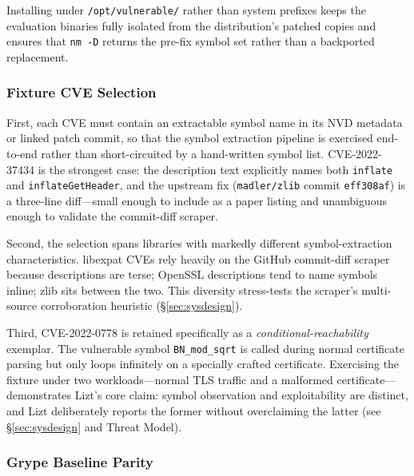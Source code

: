 \documentclass[conference]{IEEEtran}
\begin{document}
Installing under \texttt{/opt/vulnerable/} rather than system prefixes keeps the evaluation binaries fully isolated from the distribution's patched copies and ensures that \texttt{nm -D} returns the pre-fix symbol set rather than a backported replacement.

\subsubsection{Fixture CVE Selection}

First, each CVE must contain an extractable symbol name in its NVD metadata or linked patch commit, so that the symbol extraction pipeline is exercised end-to-end rather than short-circuited by a hand-written symbol list.
CVE-2022-37434 is the strongest case: the description text explicitly names both \texttt{inflate} and \texttt{inflateGetHeader}, and the upstream fix (\texttt{madler/zlib} commit \texttt{eff308af}) is a three-line diff---small enough to include as a paper listing and unambiguous enough to validate the commit-diff scraper.

Second, the selection spans libraries with markedly different symbol-extraction characteristics. libexpat CVEs rely heavily on the GitHub commit-diff scraper because descriptions are terse; OpenSSL descriptions tend to name symbols inline; zlib sits between the two.
This diversity stress-tests the scraper's multi-source corroboration heuristic (\S\ref{sec:sysdesign}).

Third, CVE-2022-0778 is retained specifically as a \emph{conditional-reachability} exemplar.
The vulnerable symbol \texttt{BN\_mod\_sqrt} is called during normal certificate parsing but only loops infinitely on a specially crafted certificate.
Exercising the fixture under two workloads---normal TLS traffic and a malformed certificate---demonstrates Lizt's core claim: symbol observation and exploitability are distinct, and Lizt deliberately reports the former without overclaiming the latter (see \S\ref{sec:sysdesign} and Threat Model).

\subsubsection{Grype Baseline Parity}
\label{sec:grype-baseline}
\end{document}
